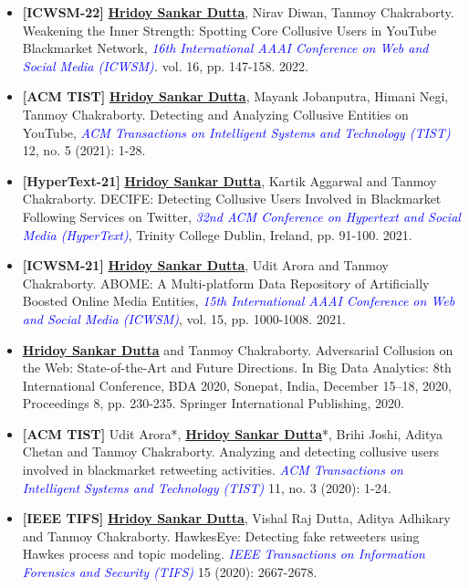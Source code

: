 \documentclass[margin, centered,lmodern]{res}
\begin{document}
\begin{resume}
\begin{itemize}[leftmargin=*]
\item  \textbf{[ICWSM-22]} \textbf{\underline{Hridoy Sankar Dutta}}, Nirav Diwan, Tanmoy Chakraborty. Weakening the Inner Strength: Spotting Core Collusive Users in YouTube Blackmarket Network,  \textit{\textcolor{blue}{16th International AAAI Conference on Web and Social Media (ICWSM)}.}  vol. 16, pp. 147-158. 2022.

\item  \textbf{[ACM TIST]}  \textbf{\underline{Hridoy Sankar Dutta}}, Mayank Jobanputra, Himani Negi, Tanmoy Chakraborty. Detecting and Analyzing Collusive Entities on YouTube,   \textit{\textcolor{blue}{ACM Transactions on Intelligent Systems and Technology (TIST)}} 12, no. 5 (2021): 1-28.

\item  \textbf{[HyperText-21]} \textbf{\underline{Hridoy Sankar Dutta}}, Kartik Aggarwal and Tanmoy Chakraborty. DECIFE: Detecting Collusive Users Involved in Blackmarket Following Services on Twitter, \textit{\textcolor{blue}{32nd ACM Conference on Hypertext and Social Media (HyperText)}}, Trinity College Dublin, Ireland,  pp. 91-100. 2021.

\item  \textbf{[ICWSM-21]} \textbf{\underline{Hridoy Sankar Dutta}}, Udit Arora and Tanmoy Chakraborty. ABOME: A Multi-platform Data Repository of Artificially Boosted Online Media Entities, \textit{\textcolor{blue}{15th International AAAI Conference on Web and Social Media (ICWSM)}}, vol. 15, pp. 1000-1008. 2021.

\item \textbf{\underline{Hridoy Sankar Dutta}} and Tanmoy Chakraborty. Adversarial Collusion on the Web: State-of-the-Art and Future Directions. In Big Data Analytics: 8th International Conference, BDA 2020, Sonepat, India, December 15–18, 2020, Proceedings 8, pp. 230-235. Springer International Publishing, 2020.

\item  \textbf{[ACM TIST]} Udit Arora*,  \textbf{\underline{Hridoy Sankar Dutta}}*,  Brihi Joshi,  Aditya Chetan and Tanmoy Chakraborty.  Analyzing and detecting collusive users involved in blackmarket retweeting activities. \textit{\textcolor{blue}{ACM Transactions on Intelligent Systems and Technology (TIST)}} 11, no. 3 (2020): 1-24.

\item  \textbf{[IEEE TIFS]} \textbf{\underline{Hridoy Sankar Dutta}},  Vishal Raj Dutta,  Aditya Adhikary and Tanmoy Chakraborty. HawkesEye: Detecting fake retweeters using Hawkes process and topic modeling. \textit{\textcolor{blue}{IEEE Transactions on Information Forensics and Security (TIFS)}} 15 (2020): 2667-2678.


\end{itemize}
\end{resume}
\end{document}
